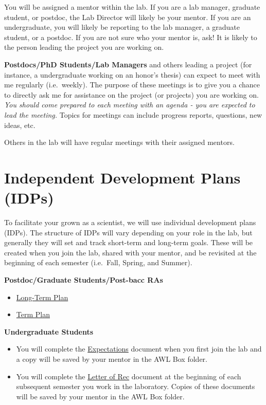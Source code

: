 \documentclass[
]{book}
\begin{document}
You will be assigned a mentor within the lab. If you are a lab manager, graduate student, or postdoc, the Lab Director will likely be your mentor. If you are an undergraduate, you will likely be reporting to the lab manager, a graduate student, or a postdoc. If you are not sure who your mentor is, ask! It is likely to the person leading the project you are working on.

\textbf{Postdocs/PhD Students/Lab Managers} and others leading a project (for instance, a undergraduate working on an honor's thesis) can expect to meet with me regularly (i.e.~weekly). The purpose of these meetings is to give you a chance to directly ask me for assistance on the project (or projects) you are working on. \emph{You should come prepared to each meeting with an agenda - you are expected to lead the meeting.} Topics for meetings can include progress reports, questions, new ideas, etc.

Others in the lab will have regular meetings with their assigned mentors.

\hypertarget{independent-development-plans-idps}{%
\section{Independent Development Plans (IDPs)}\label{independent-development-plans-idps}}

To facilitate your grown as a scientist, we will use individual development plans (IDPs). The structure of IDPs will vary depending on your role in the lab, but generally they will set and track short-term and long-term goals. These will be created when you join the lab, shared with your mentor, and be revisited at the beginning of each semester (i.e.~Fall, Spring, and Summer).

\textbf{Postdoc/Graduate Students/Post-bacc RAs}

\begin{itemize}
\item
  \href{https://osf.io/6djsm/}{Long-Term Plan}
\item
  \href{https://osf.io/qfm3r/}{Term Plan}
\end{itemize}

\textbf{Undergraduate Students}

\begin{itemize}
\item
  You will complete the \href{docs/Research_Experience_Expectations.dotx}{Expectations} document when you first join the lab and a copy will be saved by your mentor in the AWL Box folder.
\item
  You will complete the \href{docs/Letter\%20of\%20Recommendation.dotx}{Letter of Rec} document at the beginning of each subsequent semester you work in the laboratory. Copies of these documents will be saved by your mentor in the AWL Box folder.
\end{itemize}
\end{document}
